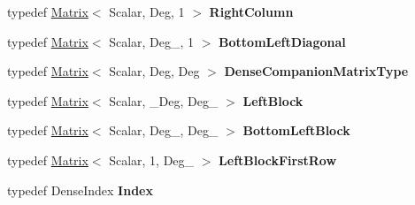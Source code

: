 \begin{DoxyCompactItemize}
typedef \hyperlink{group___core___module_class_eigen_1_1_matrix}{Matrix}$<$ Scalar, Deg, 1 $>$ {\bfseries Right\+Column}
\item 
\mbox{\label{class_eigen_1_1internal_1_1companion_aad7128996067bbf85be2bb7ca8d287d7}} 
typedef \hyperlink{group___core___module_class_eigen_1_1_matrix}{Matrix}$<$ Scalar, Deg\+\_, 1 $>$ {\bfseries Bottom\+Left\+Diagonal}
\item 
\mbox{\label{class_eigen_1_1internal_1_1companion_adcabc9870db81cf1e0db6d645d260c81}} 
typedef \hyperlink{group___core___module_class_eigen_1_1_matrix}{Matrix}$<$ Scalar, Deg, Deg $>$ {\bfseries Dense\+Companion\+Matrix\+Type}
\item 
\mbox{\label{class_eigen_1_1internal_1_1companion_a8a2e8d224bcac4436dd7eb5c04b817d5}} 
typedef \hyperlink{group___core___module_class_eigen_1_1_matrix}{Matrix}$<$ Scalar, \+\_\+\+Deg, Deg\+\_ $>$ {\bfseries Left\+Block}
\item 
\mbox{\label{class_eigen_1_1internal_1_1companion_ae5f271a028b6c68e794ac2f407185672}} 
typedef \hyperlink{group___core___module_class_eigen_1_1_matrix}{Matrix}$<$ Scalar, Deg\+\_, Deg\+\_ $>$ {\bfseries Bottom\+Left\+Block}
\item 
\mbox{\label{class_eigen_1_1internal_1_1companion_afd51b7245870ba33037049bcd2773410}} 
typedef \hyperlink{group___core___module_class_eigen_1_1_matrix}{Matrix}$<$ Scalar, 1, Deg\+\_ $>$ {\bfseries Left\+Block\+First\+Row}
\item 
\mbox{\label{class_eigen_1_1internal_1_1companion_a39a8698e815c86ce2222ac44e5d4bab8}} 
typedef Dense\+Index {\bfseries Index}
\end{DoxyCompactItemize}
